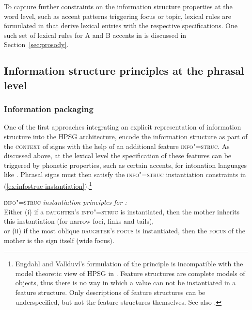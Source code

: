\documentclass[output=paper,biblatex,babelshorthands,newtxmath,draftmode,colorlinks,citecolor=brown]{langscibook}
\begin{document}
\largerpage[2]
To capture further constraints on the information structure properties
at the word level, such as accent patterns triggering focus or topic,
lexical rules are formulated in  that derive lexical entries with the
respective specifications. One such set of lexical rules for A and B
accents in  is discussed in Section~\ref{sec:prosody}.

\subsection{Information structure principles at the phrasal level}
\label{sec:infostruc-phrase}

\subsubsection{Information packaging \citep{EV96a}}

One of the first approaches integrating an explicit representation of
information structure into the HPSG architecture, \citet{EV96a} encode
the information structure as part of the  \textsc{context} of signs
with the help of an additional feature \textsc{info"=struc}. As
discussed above, at the lexical level the specification of these
features can be triggered by phonetic properties, such as certain
accents, for intonation languages like . Phrasal signs must
then satisfy the \textsc{info"=struc} instantiation constraints in
(\ref{ex:infostruc-instantiation}).\footnote{Engdahl and Vallduví’s formulation of
the principle is incompatible with the model theoretic view of HPSG in .
Feature structures are complete models of objects, thus there is no way
in which a value can not be instantiated in a feature structure. Only descriptions
of feature structures can be underspecified, but not the feature
structures themselves. See also .}

\eanoraggedright
\label{ex:infostruc-instantiation} \textsc{info"=struc} \textit{instantiation principles for :}\\
Either (i) if a \textsc{daughter}'s \textsc{info"=struc} is instantiated, then the mother inherits this instantiation (for narrow foci, links and tails),\\
or (ii) if the most oblique \textsc{daughter}'s \textsc{focus} is instantiated, then the \textsc{focus} of the mother is the sign itself (wide focus).
\z
\end{document}
